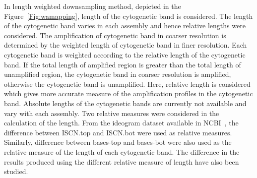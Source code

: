 In length weighted downsampling method, depicted in the Figure~\ref{Fig:wamapping}, length of the cytogenetic band is considered. The length of the cytogenetic band varies in each assembly and hence relative lengths were considered. The amplification of cytogenetic band in coarser resolution is determined by the weighted length of cytogenetic band in finer resolution. Each cytogenetic band is weighted according to the relative length of the cytogenetic band. If the total length of amplified region is greater than the total length of unamplified region, the cytogenetic band in coarser resolution is amplified, otherwise the cytogenetic band is unamplified. Here, relative length is considered which gives more accurate measure of the amplification profiles in the cytogenetic band. Absolute lengths of the cytogenetic bands are currently not available and vary with each assembly. Two relative measures were considered in the calculation of the length. From the ideogram dataset available in NCBI~\cite{ncbi}, the difference between ISCN.top and ISCN.bot were used as relative measures. Similarly, difference between bases-top and bases-bot were also used as the relative measure of the length of each cytogenetic band. The difference in the results produced using the different relative measure of length have also been studied. 






